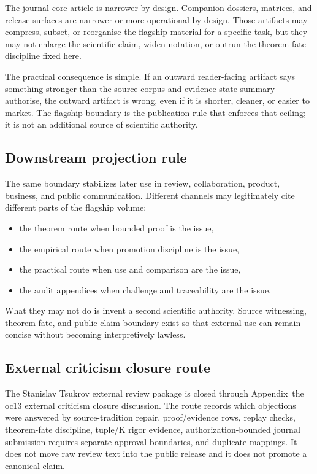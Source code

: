 The journal-core article is narrower by design. Companion dossiers, matrices,
and release surfaces are narrower or more operational by design. Those
artifacts may compress, subset, or reorganise the flagship material for a
specific task, but they may not enlarge the scientific claim, widen notation,
or outrun the theorem-fate discipline fixed here.

The practical consequence is simple. If an outward reader-facing artifact says
something stronger than the source corpus and evidence-state summary authorise, the outward
artifact is wrong, even if it is shorter, cleaner, or easier to market. The
flagship boundary is the publication rule that enforces that ceiling; it is
not an additional source of scientific authority.

\subsection{Downstream projection rule}

The same boundary stabilizes later use in review, collaboration, product,
business, and public communication. Different channels may legitimately cite
different parts of the flagship volume:

\begin{itemize}
\item the theorem route when bounded proof is the issue,
\item the empirical route when promotion discipline is the issue,
\item the practical route when use and comparison are the issue,
\item the audit appendices when challenge and traceability are the issue.
\end{itemize}

What they may not do is invent a second scientific authority. Source witnessing,
theorem fate, and public claim boundary exist so that external use can remain
concise without becoming interpretively lawless.

\subsection{External criticism closure route}
\label{sec:oc13-source-audit-external-criticism-closure}

The Stanislav Tsukrov external review package is closed through Appendix~the oc13 external criticism closure discussion. The route records which objections were answered by source-tradition repair, proof/evidence rows, replay checks, theorem-fate discipline, tuple/K rigor evidence, authorization-bounded journal submission requires separate approval boundaries, and duplicate mappings. It does not move raw review text into the public release and it does not promote a canonical claim.

